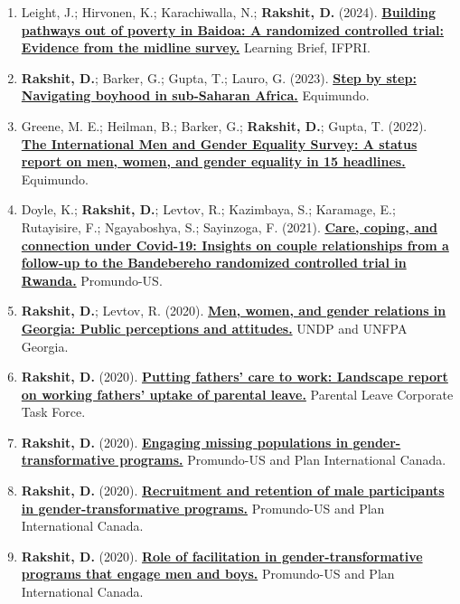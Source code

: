 \documentclass[a4paper,11pt]{article}
\newcommand{\cvheadfont}{\fontsize{12}{14.5}\selectfont}
\newcommand{\cvsubheading}[1]{\vspace{2mm}\par\noindent{\cvheadfont\textbf{#1}}\par}
\begin{document}
\cvsubheading{Technical \& policy reports}
\begin{enumerate}[leftmargin=1.5em,labelsep=0pt,itemindent=-1.5em,label={},itemsep=0.4mm,topsep=1mm]
  \item Leight, J.; Hirvonen, K.; Karachiwalla, N.; \textbf{Rakshit, D.} (2024). \href{https://hdl.handle.net/10568/140604}{\textbf{Building pathways out of poverty in Baidoa: A randomized controlled trial: Evidence from the midline survey.}} Learning Brief, IFPRI.
  \item \textbf{Rakshit, D.}; Barker, G.; Gupta, T.; Lauro, G. (2023). \href{https://www.equimundo.org/resources/step-by-step-navigating-boyhood-in-sub-saharan-africa}{\textbf{Step by step: Navigating boyhood in sub-Saharan Africa.}} Equimundo.
  \item Greene, M. E.; Heilman, B.; Barker, G.; \textbf{Rakshit, D.}; Gupta, T. (2022). \href{https://www.equimundo.org/resources/men-and-gender-equality-a-global-status-report-in-15-headlines}{\textbf{The International Men and Gender Equality Survey: A status report on men, women, and gender equality in 15 headlines.}} Equimundo.
  \item Doyle, K.; \textbf{Rakshit, D.}; Levtov, R.; Kazimbaya, S.; Karamage, E.; Rutayisire, F.; Ngayaboshya, S.; Sayinzoga, F. (2021). \href{https://www.equimundo.org/resources/rwanda-covid-study/}{\textbf{Care, coping, and connection under Covid-19: Insights on couple relationships from a follow-up to the Bandebereho randomized controlled trial in Rwanda.}} Promundo-US.
  \item \textbf{Rakshit, D.}; Levtov, R. (2020). \href{https://www.undp.org/georgia/publications/men-women-and-gender-relations-georgia-public-perceptions-and-attitudes}{\textbf{Men, women, and gender relations in Georgia: Public perceptions and attitudes.}} UNDP and UNFPA Georgia.
  \item \textbf{Rakshit, D.} (2020). \href{https://www.equimundo.org/resources/putting-fathers-care-to-work-landscape-report-on-working-fathers-uptake-of-parental-leave-2020/}{\textbf{Putting fathers' care to work: Landscape report on working fathers' uptake of parental leave.}} Parental Leave Corporate Task Force.
  \item \textbf{Rakshit, D.} (2020). \href{https://www.equimundo.org/engaging-men-in-reducing-maternal-newborn-and-child-mortality-lessons-from-bangladesh-ghana-haiti-nigeria-and-senegal/}{\textbf{Engaging missing populations in gender-transformative programs.}} Promundo-US and Plan International Canada.
  \item \textbf{Rakshit, D.} (2020). \href{https://www.equimundo.org/resources/learning-brief-recruitment-and-retention-of-male-participants-in-gender-transformative-programs/}{\textbf{Recruitment and retention of male participants in gender-transformative programs.}} Promundo-US and Plan International Canada.
  \item \textbf{Rakshit, D.} (2020). \href{https://www.equimundo.org/resources/learning-brief-role-of-facilitation-in-gender-transformative-programs-that-engage-men-and-boys/}{\textbf{Role of facilitation in gender-transformative programs that engage men and boys.}} Promundo-US and Plan International Canada.
\end{enumerate}
\end{document}
